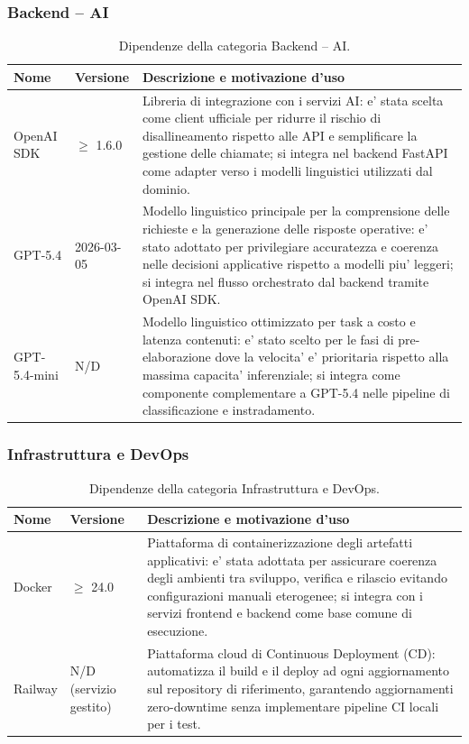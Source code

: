 \documentclass[a4paper, 11pt, oneside]{scrartcl}
\begin{document}
\subsubsection{Backend -- AI}
\begin{table}[H]
    \centering
    \renewcommand{\arraystretch}{1.2}
    \begin{tabularx}{\textwidth}{@{}l l X@{}}
        \toprule
        \textbf{Nome} & \textbf{Versione} & \textbf{Descrizione e motivazione d'uso} \\
        \midrule
        OpenAI SDK & $\geq$ 1.6.0 & Libreria di integrazione con i servizi AI: e' stata scelta come client ufficiale per ridurre il rischio di disallineamento rispetto alle API e semplificare la gestione delle chiamate; si integra nel backend FastAPI come adapter verso i modelli linguistici utilizzati dal dominio. \\
        GPT-5.4 & 2026-03-05 & Modello linguistico principale per la comprensione delle richieste e la generazione delle risposte operative: e' stato adottato per privilegiare accuratezza e coerenza nelle decisioni applicative rispetto a modelli piu' leggeri; si integra nel flusso orchestrato dal backend tramite OpenAI SDK. \\
        GPT-5.4-mini & N/D & Modello linguistico ottimizzato per task a costo e latenza contenuti: e' stato scelto per le fasi di pre-elaborazione dove la velocita' e' prioritaria rispetto alla massima capacita' inferenziale; si integra come componente complementare a GPT-5.4 nelle pipeline di classificazione e instradamento. \\
        \bottomrule
    \end{tabularx}
    \caption{Dipendenze della categoria Backend -- AI.}
    \label{tab:dip_backend_ai}
\end{table}

\subsubsection{Infrastruttura e DevOps}
\begin{table}[H]
    \centering
    \renewcommand{\arraystretch}{1.2}
    \begin{tabularx}{\textwidth}{@{}l l X@{}}
        \toprule
        \textbf{Nome} & \textbf{Versione} & \textbf{Descrizione e motivazione d'uso} \\
        \midrule
        Docker & $\geq$ 24.0 & Piattaforma di containerizzazione degli artefatti applicativi: e' stata adottata per assicurare coerenza degli ambienti tra sviluppo, verifica e rilascio evitando configurazioni manuali eterogenee; si integra con i servizi frontend e backend come base comune di esecuzione. \\
        Railway & N/D (servizio gestito) & Piattaforma cloud di Continuous Deployment (CD): automatizza il build e il deploy ad ogni aggiornamento sul repository di riferimento, garantendo aggiornamenti zero-downtime senza implementare pipeline CI locali per i test. \\
        \bottomrule
    \end{tabularx}
    \caption{Dipendenze della categoria Infrastruttura e DevOps.}
    \label{tab:dip_infra_devops}
\end{table}
\end{document}
